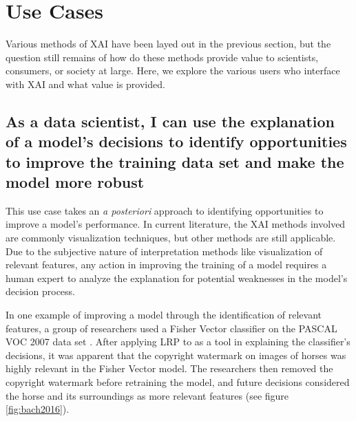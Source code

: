 \section{Use Cases} \label{sec:UseCases}

Various methods of XAI have been layed out in the previous section, but the question still remains of how do these methods provide value to scientists, consumers, or society at large.  Here, we explore the various users who interface with XAI and what value is provided.

\subsection{As a data scientist, I can use the explanation of a model's decisions to identify opportunities to improve the training data set and make the model more robust}\label{subsec:UseCase1}

This use case takes an \textit{a posteriori} approach to identifying opportunities to improve a model's performance.  In current literature, the XAI methods involved are commonly visualization techniques, but other methods are still applicable.  Due to the subjective nature of interpretation methods like visualization of relevant features, any action in improving the training of a model requires a human expert to analyze the explanation for potential weaknesses in the model's decision process.

In one example of improving a model through the identification of relevant features, a group of researchers used a Fisher Vector classifier on the PASCAL VOC 2007 data set \cite{Bach2016AnalyzingCF}.  After applying LRP to as a tool in explaining the classifier's decisions, it was apparent that the copyright watermark on images of horses was highly relevant in the Fisher Vector model.  The researchers then removed the copyright watermark before retraining the model, and future decisions considered the horse and its surroundings as more relevant features (see figure \ref{fig:bach2016}).

